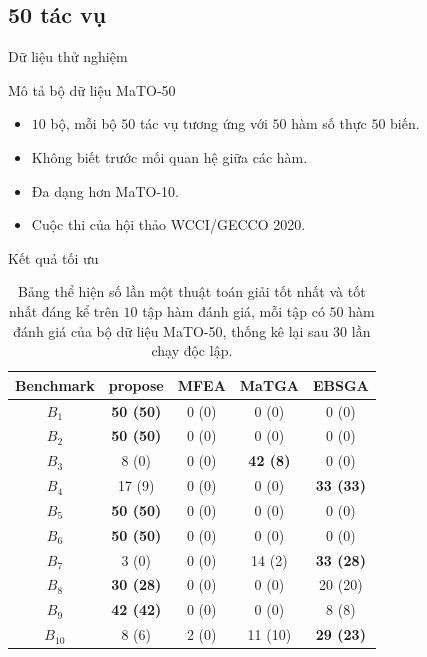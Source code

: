 \subsection{50 tác vụ}
    \begin{frame}{Dữ liệu thử nghiệm}
        \begin{block}{Mô tả bộ dữ liệu MaTO-50}
            \begin{itemize}
                \item $10$ bộ, mỗi bộ $50$ tác vụ tương ứng với $50$ hàm số thực $50$ biến.
                \item Không biết trước mối quan hệ giữa các hàm.
                \item Đa dạng hơn MaTO-10.
                \item Cuộc thi của hội thảo WCCI/GECCO 2020.
            \end{itemize}
        \end{block}
    \end{frame}
    \begin{frame}{Kết quả tối ưu}
        \begin{table}[hp]
            \centering
            \begin{tabular}{@{}ccccc@{}}
                \toprule
                \textbf{Benchmark} & \gls{propose} & MFEA & MaTGA & EBSGA \\ \midrule
                $B_1$    & \textbf{50 (50)} & 0 (0) & 0 (0)           & 0 (0) \\
                $B_2$    & \textbf{50 (50)} & 0 (0) & 0 (0)           & 0 (0) \\
                $B_3$    & 8 (0)            & 0 (0) & \textbf{42 (8)} & 0 (0) \\
                $B_4$    & 17 (9)           & 0 (0) & 0 (0)           & \textbf{33 (33)} \\
                $B_5$    & \textbf{50 (50)} & 0 (0) & 0 (0)           & 0 (0) \\
                $B_6$    & \textbf{50 (50)} & 0 (0) & 0 (0)           & 0 (0) \\
                $B_7$    & 3 (0)            & 0 (0) & 14 (2)          & \textbf{33 (28)} \\
                $B_8$    & \textbf{30 (28)} & 0 (0) & 0 (0)           & 20 (20) \\
                $B_9$    & \textbf{42 (42)} & 0 (0) & 0 (0)           & 8 (8) \\
                $B_{10}$ & 8 (6)            & 2 (0) & 11 (10)         & \textbf{29 (23)} \\
                \bottomrule
            \end{tabular}
            \caption{Bảng thể hiện số lần một thuật toán giải tốt nhất và tốt nhất đáng kể trên $10$ tập hàm đánh giá, mỗi tập có $50$ hàm đánh giá của bộ dữ liệu MaTO-50, thống kê lại sau $30$ lần chạy độc lập.}
            \label{tab:experiment:last10}
        \end{table}
    \end{frame}
